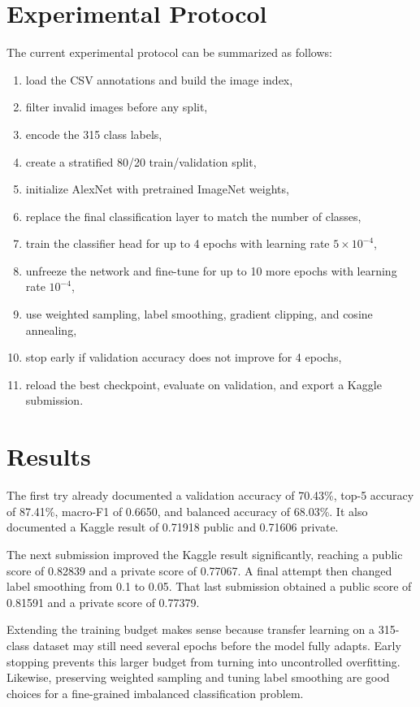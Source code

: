 \documentclass[11pt,a4paper]{article}
\begin{document}
\section{Experimental Protocol}
The current experimental protocol can be summarized as follows:
\begin{enumerate}[leftmargin=1.6em]
    \item load the CSV annotations and build the image index,
    \item filter invalid images before any split,
    \item encode the 315 class labels,
    \item create a stratified 80/20 train/validation split,
    \item initialize AlexNet with pretrained ImageNet weights,
    \item replace the final classification layer to match the number of classes,
    \item train the classifier head for up to 4 epochs with learning rate $5 \times 10^{-4}$,
    \item unfreeze the network and fine-tune for up to 10 more epochs with learning rate $10^{-4}$,
    \item use weighted sampling, label smoothing, gradient clipping, and cosine annealing,
    \item stop early if validation accuracy does not improve for 4 epochs,
    \item reload the best checkpoint, evaluate on validation, and export a Kaggle submission.
\end{enumerate}

\section{Results}
The first try already documented a validation accuracy of 70.43\%, top-5 accuracy of 87.41\%, macro-F1 of 0.6650, and balanced accuracy of 68.03\%. It also documented a Kaggle result of 0.71918 public and 0.71606 private.

The next submission improved the Kaggle result significantly, reaching a public score of 0.82839 and a private score of 0.77067. A final attempt then changed label smoothing from 0.1 to 0.05. That last submission obtained a public score of 0.81591 and a private score of 0.77379.

Extending the training budget makes sense because transfer learning on a 315-class dataset may still need several epochs before the model fully adapts. Early stopping prevents this larger budget from turning into uncontrolled overfitting. Likewise, preserving weighted sampling and tuning label smoothing are good choices for a fine-grained imbalanced classification problem.
\end{document}
